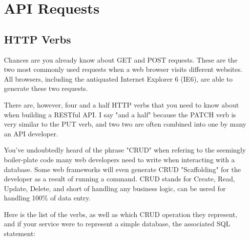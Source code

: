 \documentclass{book}
\begin{document}
\chapter{API Requests}

\section{HTTP Verbs}

Chances are you already know about GET and POST requests. These are the two most commonly used requests when a web browser visits different websites. All browsers, including the antiquated Internet Explorer 6 (IE6), are able to generate these two requests.

There are, however, four and a half HTTP verbs that you need to know about when building a RESTful API. I say "and a half" because the PATCH verb is very similar to the PUT verb, and two two are often combined into one by many an API developer.

You've undoubtedly heard of the phrase "CRUD" when refering to the seemingly boiler-plate code many web developers need to write when interacting with a database. Some web frameworks will even generate CRUD "Scaffolding" for the developer as a result of running a command. CRUD stands for Create, Read, Update, Delete, and short of handling any business logic, can be usred for handling 100\% of data entry.

Here is the list of the verbs, as well as which CRUD operation they represent, and if your service were to represent a simple database, the associated SQL statement:
\end{document}
